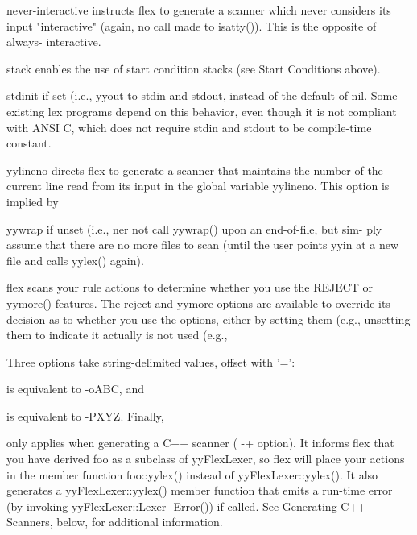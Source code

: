 \documentclass[12pt,spanish,twocolumn,lettersize]{article}
\begin{document}
{       never-interactive
	      instructs	 flex  to  generate a scanner which never
	      considers its input "interactive" (again,	 no  call
	      made to isatty()).  This is the opposite of always-
	      interactive.

       stack  enables the use  of  start  condition  stacks  (see
	      Start Conditions above).

       stdinit
	      if set (i.e., %
	      yyout to stdin and stdout, instead of  the  default
	      of  nil.	Some existing lex programs depend on this
	      behavior, even though it is not compliant with ANSI
	      C,  which	 does  not require stdin and stdout to be
	      compile-time constant.

       yylineno
	      directs flex to generate a scanner  that	maintains
	      the  number of the current line read from its input
	      in the global variable yylineno.	 This  option  is
	      implied by %

       yywrap if  unset (i.e., %
	      ner not call yywrap() upon an end-of-file, but sim-
	      ply  assume  that	 there	are no more files to scan
	      (until the user points yyin at a new file and calls
	      yylex() again).

       flex  scans your rule actions to determine whether you use
       the REJECT or yymore() features.	 The  reject  and  yymore
       options	are  available	to  override  its  decision as to
       whether you use the options, either by setting them (e.g.,
       unsetting them to indicate it actually is not used  (e.g.,

       Three  options  take  string-delimited values, offset with
       '=':


       is equivalent to -oABC, and


       is equivalent to -PXYZ.	Finally,


       only applies when generating a C++ scanner (  -+	 option).
       It informs flex that you have derived foo as a subclass of
       yyFlexLexer, so flex will place your actions in the member
       function foo::yylex() instead of yyFlexLexer::yylex().  It
       also generates a yyFlexLexer::yylex() member function that
       emits  a	 run-time  error (by invoking yyFlexLexer::Lexer-
       Error()) if called.  See Generating C++	Scanners,  below,
       for additional information.

}
\end{document}
